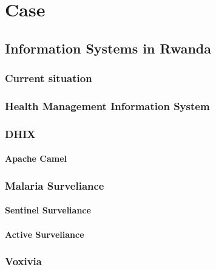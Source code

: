 \chapter{Case}


\section{Information Systems in Rwanda}
\subsection{Current situation}

\subsection{Health Management Information System}

\subsection{DHIX}

\subsubsection{Apache Camel}

\subsection{Malaria Surveliance}
\subsubsection{Sentinel Surveliance}
\subsubsection{Active Surveliance}

\subsection{Voxivia}

